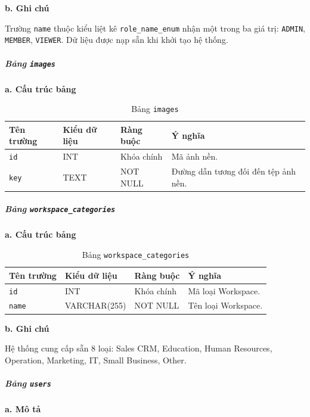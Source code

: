\hspace{1.5em}\textbf{b. Ghi chú}

Trường \texttt{name} thuộc kiểu liệt kê \texttt{role\_name\_enum} nhận một trong ba giá trị: \texttt{ADMIN}, \texttt{MEMBER}, \texttt{VIEWER}. Dữ liệu được nạp sẵn khi khởi tạo hệ thống.


\subparagraph{Bảng \texttt{images}} \mbox{}

\hspace{1.5em}\textbf{a. Cấu trúc bảng}

\begin{table}[H]
\centering
\begin{tabular}{|p{3cm}|p{3.5cm}|p{3.5cm}|p{4cm}|}
\hline
\textbf{Tên trường} & \textbf{Kiểu dữ liệu} & \textbf{Ràng buộc} & \textbf{Ý nghĩa} \\
\hline
\texttt{id} & INT & Khóa chính & Mã ảnh nền. \\
\hline
\texttt{key} & TEXT & NOT NULL & Đường dẫn tương đối đến tệp ảnh nền. \\
\hline
\end{tabular}
\caption{Bảng \texttt{images}}
\label{tab:db_images}
\end{table}


\subparagraph{Bảng \texttt{workspace\_categories}} \mbox{}

\hspace{1.5em}\textbf{a. Cấu trúc bảng}

\begin{table}[H]
\centering
\begin{tabular}{|p{3cm}|p{3.5cm}|p{3.5cm}|p{4cm}|}
\hline
\textbf{Tên trường} & \textbf{Kiểu dữ liệu} & \textbf{Ràng buộc} & \textbf{Ý nghĩa} \\
\hline
\texttt{id} & INT & Khóa chính & Mã loại Workspace. \\
\hline
\texttt{name} & VARCHAR(255) & NOT NULL & Tên loại Workspace. \\
\hline
\end{tabular}
\caption{Bảng \texttt{workspace\_categories}}
\label{tab:db_workspace_categories}
\end{table}

\hspace{1.5em}\textbf{b. Ghi chú}

Hệ thống cung cấp sẵn 8 loại: Sales CRM, Education, Human Resources, Operation, Marketing, IT, Small Business, Other.


\subparagraph{Bảng \texttt{users}} \mbox{}

\hspace{1.5em}\textbf{a. Mô tả}

